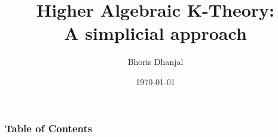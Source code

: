 \documentclass{beamer}
\title{Higher Algebraic K-Theory:\\ A simplicial approach}
\subtitle{}
\author{Bhoris Dhanjal}
\institute{Department of Mathematics,\\ University of Mumbai}
\date{\today}
\begin{document}

\begin{frame}
	\maketitle %
\end{frame}




\begin{frame}
	\frametitle{Table of Contents}
	\tableofcontents
\end{frame}
\end{document}
